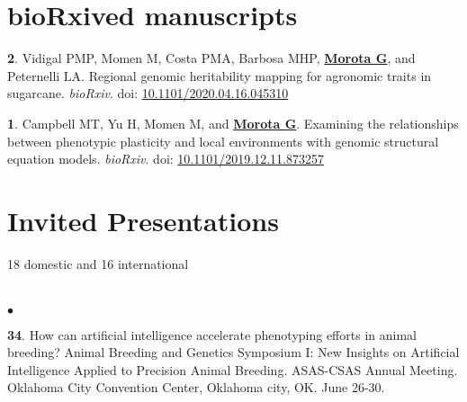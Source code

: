 \documentclass[margin,line,10pt]{res}
\newenvironment{list1}{
  \begin{list}{\ding{113}}{%
      \setlength{\itemsep}{0in}
      \setlength{\parsep}{0in} \setlength{\parskip}{0in}
      \setlength{\topsep}{0in} \setlength{\partopsep}{0in} 
      \setlength{\leftmargin}{0.17in}}}{\end{list}}
\newenvironment{list2}{
  \begin{list}{$\bullet$}{%
      \setlength{\itemsep}{0in}
      \setlength{\parsep}{0in} \setlength{\parskip}{0in}
      \setlength{\topsep}{0in} \setlength{\partopsep}{0in} 
      \setlength{\leftmargin}{0.2in}}}{\end{list}}
\begin{document}
\begin{resume}
\begin{list1}
\end{list1}





\vspace{1.0cm}
\section{\sc bioRxived manuscripts}

\begin{list1}

  \item [{\bf 2}.] Vidigal PMP, Momen M, Costa PMA, Barbosa MHP, \textbf{\underline{Morota G}}, and Peternelli LA. Regional genomic heritability mapping for agronomic traits in sugarcane. \emph{bioRxiv}. doi: \textcolor{blue}{\href{https://doi.org/10.1101/2020.04.16.045310}{10.1101/2020.04.16.045310}}

  \vspace{0.5cm}

\item [{\bf 1}.] Campbell MT, Yu H, Momen M, and \textbf{\underline{Morota G}}. Examining the relationships between phenotypic plasticity and local environments with genomic structural equation models. \emph{bioRxiv}. doi: \textcolor{blue}{\href{https://doi.org/10.1101/2019.12.11.873257}{10.1101/2019.12.11.873257}}
  

\end{list1}




\vspace{1.0cm}
\section{\sc Invited Presentations}
\vspace{0.5cm}
18 domestic and 16 international \\
\noindent




\section{}
\begin{list2}
  
\item [{\bf 34}.] How can artificial intelligence accelerate phenotyping efforts in animal breeding? Animal Breeding and Genetics Symposium I: New Insights on Artificial Intelligence Applied to Precision Animal Breeding. ASAS-CSAS Annual Meeting. Oklahoma City Convention Center, Oklahoma city, OK. June 26-30.


\end{list2}
\end{resume}
\end{document}
